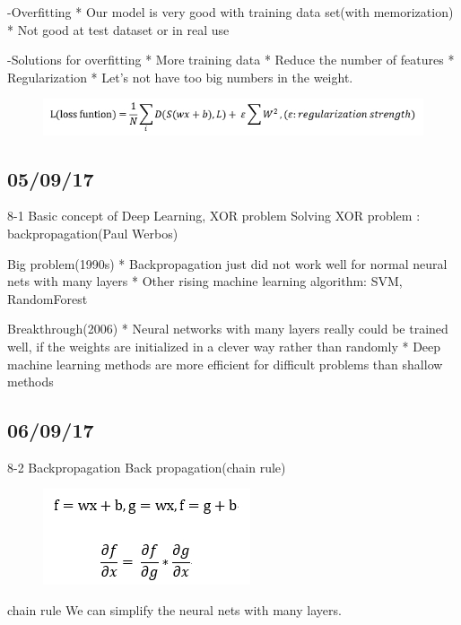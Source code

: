 \documentclass{article}
\begin{document}
\begin{CJK}{UTF8}{}
-Overfitting\newline
*	Our model is very good with training data set(with memorization)\newline
*	Not good at test dataset or in real use\newline

-Solutions for overfitting\newline
*	More training data\newline
*	Reduce the number of features\newline
*	Regularization\newline
*	Let’s not have too big numbers in the weight.\newline
\begin{figure}[h!]
\centering
\includegraphics[scale=0.6]{10.jpg}
\end{figure}

\subsection{05/09/17}
8-1 Basic concept of Deep Learning, XOR problem\newline
Solving XOR problem : backpropagation(Paul Werbos)\newline

Big problem(1990s)\newline
*	Backpropagation just did not work well for normal neural nets with many layers\newline
*	Other rising machine learning algorithm: SVM, RandomForest\newline

Breakthrough(2006)\newline
*	Neural networks with many layers really could be trained well, if the weights are initialized in a clever way rather than randomly\newline
*	Deep machine learning methods are more efficient for difficult problems than shallow methods\newline

\subsection{06/09/17}
8-2 Backpropagation\newline
Back propagation(chain rule)\newline
\begin{figure}[h!]
\centering
\includegraphics[scale=0.6]{11.jpg}
\end{figure}
chain rule\newline
We can simplify the neural nets with many layers. \newline


\end{CJK}
\end{document}
